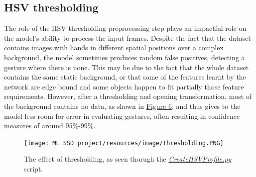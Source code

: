 \documentclass[10pt,twocolumn,letterpaper]{article}
\begin{document}
\subsection{HSV thresholding}
\begin{flushleft}
The role of the HSV thresholding preprocessing step plays an impactful role on the model's ability to process the input frames. Despite the fact that the dataset contains images with hands in different spatial positions over a complex background, the model sometimes produces random false positives, detecting a gesture where there is none. This may be due to the fact that the whole dataset contains the same static background, or that some of the features learnt by the network are edge bound and some objects happen to fit partially those feature requirements. However, after a thresholding and opening transformation, most of the background contains no data, as shown in \hyperref[figure6]{Figure 6}, and thus gives to the model less room for error in evaluating gestures, often resulting in confidence measures of around 95\%-99\%.

\begin{figure}[!h]
    \centering
    \texttt{[image: ML SSD project/resources/image/thresholding.PNG]}
    \caption{The effect of thresholding, as seen thorugh the \textit{\href{https://github.com/MarzioVallero/ML-Based-Blender-Gestural-Input-Interface/blob/master/CreateHSVProfile.py}{CreateHSVProfile.py}} script.}
\end{figure}
\label{figure6}

\end{flushleft}
\end{document}
